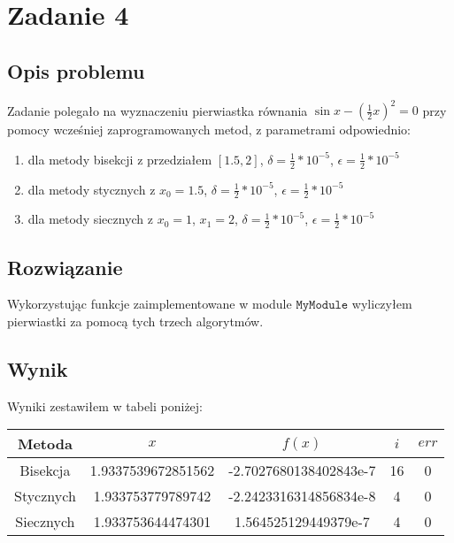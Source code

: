 \section{Zadanie 4}
\subsection{Opis problemu}
Zadanie polegało na wyznaczeniu pierwiastka równania $ \sin{x} - (\frac{1}{2}x)^{2} = 0 $ przy pomocy wcześniej zaprogramowanych metod, z parametrami odpowiednio:
\begin{enumerate}
  \item dla metody bisekcji z przedziałem $[1.5, 2]$, $\delta = \frac{1}{2}*10^{-5}$, $\epsilon = \frac{1}{2}*10^{-5}$
  \item dla metody stycznych z $ x_0 = 1.5$, $\delta = \frac{1}{2}*10^{-5}$, $\epsilon = \frac{1}{2}*10^{-5}$  
  \item dla metody siecznych z $ x_0 = 1$, $x_1 = 2$, $\delta = \frac{1}{2}*10^{-5}$, $\epsilon = \frac{1}{2}*10^{-5}$
  
  \end{enumerate}
\subsection{Rozwiązanie}
Wykorzystując funkcje zaimplementowane w module $ \texttt{MyModule} $ wyliczyłem pierwiastki za pomocą  tych trzech algorytmów.
\subsection{Wynik}


Wyniki zestawiłem w tabeli poniżej: \\
\begin{center}
\begin{tabular}{|c|c|c|c|c|}
  \hline 
    Metoda & $x$ & $ f(x)$ & $i$ & $err$ \\
  \hline
  Bisekcja & 1.9337539672851562 & -2.7027680138402843e-7 & 16 & 0\\
  \hline 
  Stycznych & 1.933753779789742 & -2.2423316314856834e-8 & 4 & 0\\
  \hline  
  Siecznych & 1.933753644474301 & 1.564525129449379e-7 & 4 & 0 \\
  \hline
\end{tabular} 
\end{center}